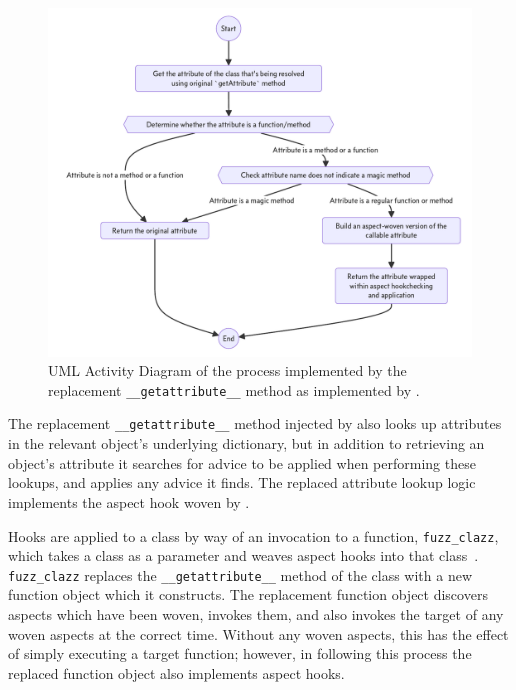 \begin{figure}
\includegraphics[width=0.9\columnwidth]{30_prior_work/diagrams/replacement_getattr.pdf}
\caption{UML Activity Diagram of the process implemented by the replacement
\lstinline{__getattribute__} method as implemented by \pydysofu{}.}
\label{fig:early_pdsf_replaced_getattr_diagram}
\end{figure}

The replacement \lstinline{__getattribute__} method injected by
\pydysofu{} also looks up attributes in the relevant object's underlying dictionary,
but in addition to retrieving an object's attribute it searches for advice to be
applied when performing these lookups, and applies any advice it finds. The
replaced attribute lookup logic implements the aspect hook woven by \pydysofu{}.

Hooks are applied to a class by way of an invocation to a function,
\lstinline{fuzz_clazz}, which takes a class as a parameter and weaves aspect
hooks into that class~\cite{pdsf_repo,asp_repo}. \lstinline{fuzz_clazz} replaces
the \lstinline{__getattribute__} method of the class with a new function
object which it constructs. The replacement function object discovers aspects
which have been woven, invokes them, and also invokes the target of any woven
aspects at the correct time. Without any woven aspects, this has the effect of
simply executing a target function; however, in following this process the
replaced function object also implements aspect hooks.

